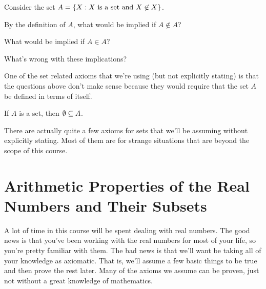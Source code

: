 	\begin{question}
	\item Consider the set $A = \left\{X : X \text{ is a set and } X \not\in X\right\}$.
	\begin{qpart}
	\item By the definition of $A$, what would be implied if $A \not\in A$?
	\vspace{.5in}
	\item What would be implied if $A \in A$?
	\vspace{.5in}
	\item What's wrong with these implications?
	\vspace{.5in}
	\end{qpart}
	\end{question}
	One of the set related axioms that we're using (but not explicitly stating) is that the questions above don't make sense because they would require that the set $A$ be defined in terms of itself. 
	
\begin{axiom} If $A$ is a set, then $\emptyset \subseteq A$.
\end{axiom}
	
There are actually quite a few axioms for sets that we'll be assuming without explicitly stating.  Most of them are for strange situations that are beyond the scope of this course.

\section{Arithmetic Properties of the Real Numbers and Their Subsets}

\noindent A lot of time in this course will be spent dealing with real numbers.  The good news is that you've been working with the real numbers for most of your life, so you're pretty familiar with them.  The bad news is that we'll want be taking all of your knowledge as axiomatic.  That is, we'll assume a few basic things to be true and then prove the rest later.  Many of the axioms we assume can be proven, just not without a great knowledge of mathematics.\\


